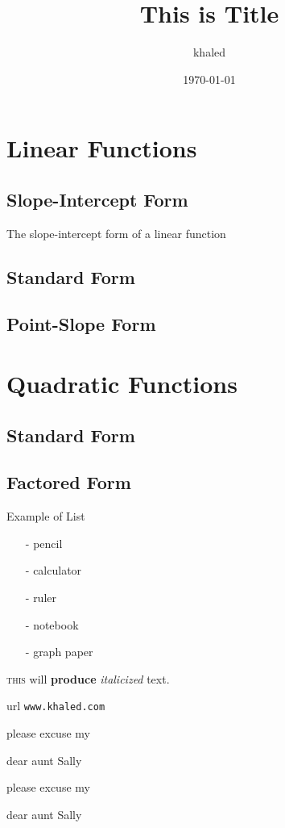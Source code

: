 \documentclass[11pt]{article}
\begin{document}
\tableofcontents

\title{This is Title}
\author{khaled}
\date{\today}
\maketitle

\section{Linear Functions}
  \subsection{Slope-Intercept Form}
  The slope-intercept form of a linear function
  \subsection{Standard Form}
  \subsection{Point-Slope Form}
\section{Quadratic Functions}
  \subsection{Standard Form}
  \subsection{Factored Form}

Example of List
\begin{itemize}
\item[-] pencil
\item[-] calculator 
\item[-] ruler
\item[-] notebook
\item[-] graph paper  
\end{itemize}

\textsc{this} will \textbf{produce} \textit{italicized} text.

url \texttt{www.khaled.com}


please excuse my \begin{small}
  dear aunt Sally
\end{small}

please excuse my \begin{large}
  dear aunt Sally
\end{large}
\end{document}
